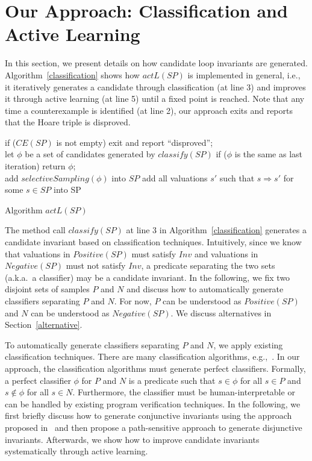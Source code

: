 \section{Our Approach: Classification and Active Learning}
\label{sec:classifierlearning}
In this section, we present details on how candidate loop invariants are generated. Algorithm~\ref{classification} shows how $actL(SP)$ is implemented in general, i.e., it iteratively generates a candidate through classification (at line 3) and improves it through active learning (at line 5) until a fixed point is reached. Note that any time a counterexample is identified (at line 2), our approach exits and reports that the Hoare triple is disproved.

\begin{algorithm}[t]
\SetAlgoVlined
\Indm
\Indp
{} {
    if ($CE(SP)$ is not empty) { exit and report ``disproved''; } \\
    let $\phi$ be a set of candidates generated by $classify(SP)$\;
    if ($\phi$ is the same as last iteration){ return $\phi$; } \\
    add $selectiveSampling(\phi)$ into $SP$\;
    add all valuations $s'$ such that $s \Rightarrow s'$ for some $s \in SP$ into SP\;
}
\caption{Algorithm $actL(SP)$}
\label{classification}
\end{algorithm}

The method call $classify(SP)$ at line 3 in Algorithm~\ref{classification} generates a candidate invariant based on classification techniques. Intuitively, since we know that valuations in $Positive(SP)$ must satisfy $Inv$ and valuations in $Negative(SP)$ must not satisfy $Inv$, a predicate separating the two sets (a.k.a.~a classifier) may be a candidate invariant. In the following, we fix two disjoint sets of samples $P$ and $N$ and discuss how to automatically generate classifiers separating $P$ and $N$. For now, $P$ can be understood as $Positive(SP)$ and $N$ can be understood as $Negative(SP)$. We discuss alternatives in Section~\ref{alternative}.

To automatically generate classifiers separating $P$ and $N$, we apply existing classification techniques. There are many classification algorithms, e.g.,~\cite{perceptron,quinlan1986induction,svm:original}. In our approach, the classification algorithms must generate perfect classifiers. Formally, a perfect classifier $\phi$ for $P$ and $N$ is a predicate such that $s \in \phi$ for all $s \in P$ and $s \not \in \phi$ for all $s \in N$. Furthermore, the classifier must be human-interpretable or can be handled by existing program verification techniques.
In the following, we first briefly discuss how to generate conjunctive invariants using the approach proposed in~\cite{sharma2012interpolants} and then  propose a path-sensitive approach to generate disjunctive invariants. Afterwards, we show how to improve candidate invariants systematically through active learning.

